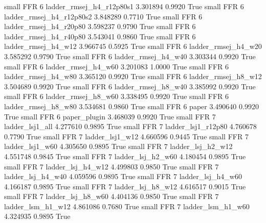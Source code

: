      small      FFR                 6 ladder_rmsej_h4_r12p80s1   3.301894      0.9920    True
     small      FFR                 6 ladder_rmsej_h4_r12p80s2   3.848289      0.7710    True
     small      FFR                 6   ladder_rmsej_h4_r20p80   3.598237      0.9790    True
     small      FFR                 6   ladder_rmsej_h4_r40p80   3.543041      0.9860    True
     small      FFR                 6      ladder_rmsej_h4_w12   3.966745      0.5925    True
     small      FFR                 6      ladder_rmsej_h4_w20   3.585292      0.9790    True
     small      FFR                 6      ladder_rmsej_h4_w40   3.303344      0.9920    True
     small      FFR                 6      ladder_rmsej_h4_w60   3.201083      1.0000    True
     small      FFR                 6      ladder_rmsej_h4_w80   3.365120      0.9920    True
     small      FFR                 6      ladder_rmsej_h8_w12   3.504689      0.9920    True
     small      FFR                 6      ladder_rmsej_h8_w40   3.385992      0.9920    True
     small      FFR                 6      ladder_rmsej_h8_w60   3.338495      0.9920    True
     small      FFR                 6      ladder_rmsej_h8_w80   3.534681      0.9860    True
     small      FFR                 6                    paper   3.490640      0.9920    True
     small      FFR                 6             paper_plugin   3.468039      0.9920    True
     small      FFR                 7          ladder_lsj1_all   4.277610      0.9895    True
     small      FFR                 7       ladder_lsj1_r12p80   4.760678      0.7790    True
     small      FFR                 7          ladder_lsj1_w12   4.660596      0.9445    True
     small      FFR                 7          ladder_lsj1_w60   4.305650      0.9895    True
     small      FFR                 7        ladder_lsj_h2_w12   4.551748      0.9845    True
     small      FFR                 7        ladder_lsj_h2_w60   4.180454      0.9895    True
     small      FFR                 7        ladder_lsj_h4_w12   4.499803      0.9850    True
     small      FFR                 7        ladder_lsj_h4_w40   4.059596      0.9895    True
     small      FFR                 7        ladder_lsj_h4_w60   4.166187      0.9895    True
     small      FFR                 7        ladder_lsj_h8_w12   4.616517      0.9015    True
     small      FFR                 7        ladder_lsj_h8_w60   4.404136      0.9850    True
     small      FFR                 7        ladder_lsm_h1_w12   4.861086      0.7680    True
     small      FFR                 7        ladder_lsm_h1_w60   4.324935      0.9895    True
